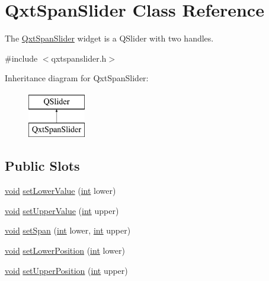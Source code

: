 \hypertarget{class_qxt_span_slider}{\section{Qxt\-Span\-Slider Class Reference}
\label{class_qxt_span_slider}
}


The \hyperlink{class_qxt_span_slider}{Qxt\-Span\-Slider} widget is a Q\-Slider with two handles.  




{\ttfamily \#include $<$qxtspanslider.\-h$>$}

Inheritance diagram for Qxt\-Span\-Slider\-:\begin{figure}[H]
\begin{center}
\leavevmode
\includegraphics[height=2.000000cm]{class_qxt_span_slider}
\end{center}
\end{figure}
\subsection*{Public Slots}
\begin{DoxyCompactItemize}
\item 
\hyperlink{group___u_a_v_objects_plugin_ga444cf2ff3f0ecbe028adce838d373f5c}{void} \hyperlink{class_qxt_span_slider_a61c59417faf46c042b2af6a641bacc44}{set\-Lower\-Value} (\hyperlink{ioapi_8h_a787fa3cf048117ba7123753c1e74fcd6}{int} lower)
\item 
\hyperlink{group___u_a_v_objects_plugin_ga444cf2ff3f0ecbe028adce838d373f5c}{void} \hyperlink{class_qxt_span_slider_a9c450417490fdc20f96a0f64ffa1ad85}{set\-Upper\-Value} (\hyperlink{ioapi_8h_a787fa3cf048117ba7123753c1e74fcd6}{int} upper)
\item 
\hyperlink{group___u_a_v_objects_plugin_ga444cf2ff3f0ecbe028adce838d373f5c}{void} \hyperlink{class_qxt_span_slider_a7fc6e87a5ec80c01579157f4893d0117}{set\-Span} (\hyperlink{ioapi_8h_a787fa3cf048117ba7123753c1e74fcd6}{int} lower, \hyperlink{ioapi_8h_a787fa3cf048117ba7123753c1e74fcd6}{int} upper)
\item 
\hyperlink{group___u_a_v_objects_plugin_ga444cf2ff3f0ecbe028adce838d373f5c}{void} \hyperlink{class_qxt_span_slider_a4f3d32d35cdbaa7fd4034eff2144bc7c}{set\-Lower\-Position} (\hyperlink{ioapi_8h_a787fa3cf048117ba7123753c1e74fcd6}{int} lower)
\item 
\hyperlink{group___u_a_v_objects_plugin_ga444cf2ff3f0ecbe028adce838d373f5c}{void} \hyperlink{class_qxt_span_slider_af30253753b948b4f7999b84961ad663b}{set\-Upper\-Position} (\hyperlink{ioapi_8h_a787fa3cf048117ba7123753c1e74fcd6}{int} upper)
\end{DoxyCompactItemize}
